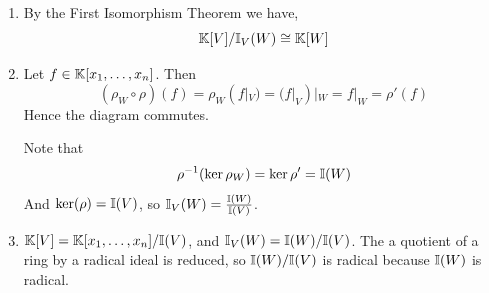 \documentclass[Notebook.tex]{subfiles}
\begin{document}
\begin{solution}
\begin{enumerate}
        \item By the First Isomorphism Theorem we have, 
        \[\mathbb K[V]/\mathbb I_V(W) \cong \mathbb K[W]\]

        \item 
        Let $f\in \mathbb K[x_1,\ldots,x_n]$. Then
        \[
        (\rho_W\circ \rho)(f)
        =\rho_W(f|_V)
        =(f|_V)|_W = f |_W = \rho'(f)
        \]
        Hence the diagram commutes.

        Note that 
        \[
        \rho^{-1}(\ker \rho_W)=\ker \rho' = \mathbb I(W)
        \]
        And $\ker(\rho)=\mathbb I(V)$, so $\mathbb I_V(W)=\frac{\mathbb I(W)}{\mathbb I(V)}$. 

        \item $\mathbb K[V]=\mathbb K[x_1, \ldots, x_n] / \mathbb I(V)$, and $\mathbb I_V (W)=\mathbb I(W)/\mathbb I(V)$. The a quotient of a ring by a radical ideal is reduced, so $\mathbb I(W)/\mathbb I(V)$ is radical because $\mathbb I(W)$ is radical.
    \end{enumerate}
\end{solution}



    



    
\end{document}
